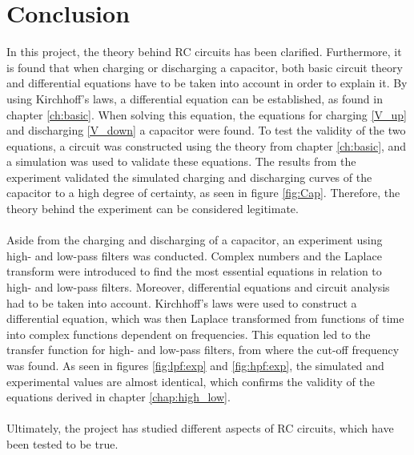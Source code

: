 \chapter{Conclusion}
In this project, the theory behind RC circuits has been clarified. Furthermore, it is found that when charging or discharging a capacitor, both basic circuit theory and differential equations have to be taken into account in order to explain it. By using Kirchhoff's laws, a differential equation can be established, as found in chapter \ref{ch:basic}. When solving this equation, the equations for charging \eqref{V_up} and discharging \eqref{V_down} a capacitor were found. To test the validity of the two equations, a circuit was constructed using the theory from chapter \ref{ch:basic}, and a simulation was used to validate these equations. The results from the experiment validated the simulated charging and discharging curves of the capacitor to a high degree of certainty, as seen in figure \ref{fig:Cap}. Therefore, the theory behind the experiment can be considered legitimate.
\\ \\
Aside from the charging and discharging of a capacitor, an experiment using high- and low-pass filters was conducted. Complex numbers and the Laplace transform were introduced to find the most essential equations in relation to high- and low-pass filters. Moreover, differential equations and circuit analysis had to be taken into account. Kirchhoff's laws were used to construct a differential equation, which was then Laplace transformed from functions of time into complex functions dependent on frequencies. This equation led to the transfer function for high- and low-pass filters, from where the cut-off frequency was found. As seen in figures \ref{fig:lpf:exp} and \ref{fig:hpf:exp}, the simulated and experimental values are almost identical, which confirms the validity of the equations derived in chapter \ref{chap:high_low}.
\\ \\
Ultimately, the project has studied different aspects of RC circuits, which have been tested to be true. 
